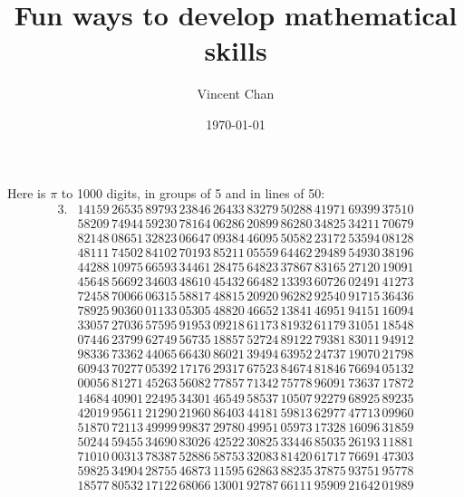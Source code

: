 \documentclass{article}
\title{Fun ways to develop mathematical skills}
\author{Vincent Chan}
\date{\today}
\begin{document}
{\Large
Here is $\pi$ to 1000 digits, in groups of 5 and in lines of 50:}
\LARGE
\begin{align*}
3.&14159 \, 26535 \, 89793 \, 23846 \, 26433 \, 83279 \, 50288 \, 41971 \, 69399 \, 37510 \\ 
&58209 \, 74944 \, 59230 \, 78164 \, 06286 \, 20899 \, 86280 \, 34825 \, 34211 \, 70679 \\
&82148 \, 08651 \, 32823 \, 06647 \, 09384 \, 46095 \, 50582 \, 23172 \, 53594 \, 08128 \\
&48111 \, 74502 \, 84102 \, 70193 \, 85211 \, 05559 \, 64462 \, 29489 \, 54930 \, 38196 \\ 
&44288 \, 10975 \, 66593 \, 34461 \, 28475 \, 64823 \, 37867 \, 83165 \, 27120 \, 19091 \\
&45648 \, 56692 \, 34603 \, 48610 \, 45432 \, 66482 \, 13393 \, 60726 \, 02491 \, 41273 \\
&72458 \, 70066 \, 06315 \, 58817 \, 48815 \, 20920 \, 96282 \, 92540 \, 91715 \, 36436 \\
&78925 \, 90360 \, 01133 \, 05305 \, 48820 \, 46652 \, 13841 \, 46951 \, 94151 \, 16094 \\
&33057 \, 27036 \, 57595 \, 91953 \, 09218 \, 61173 \, 81932 \, 61179 \, 31051 \, 18548 \\
&07446 \, 23799 \, 62749 \, 56735 \, 18857 \, 52724 \, 89122 \, 79381 \, 83011 \, 94912 \\
&98336 \, 73362 \, 44065 \, 66430 \, 86021 \, 39494 \, 63952 \, 24737 \, 19070 \, 21798 \\
&60943 \, 70277 \, 05392 \, 17176 \, 29317 \, 67523 \, 84674 \, 81846 \, 76694 \, 05132 \\
&00056 \, 81271 \, 45263 \, 56082 \, 77857 \, 71342 \, 75778 \, 96091 \, 73637 \, 17872 \\
&14684 \, 40901 \, 22495 \, 34301 \, 46549 \, 58537 \, 10507 \, 92279 \, 68925 \, 89235 \\
&42019 \, 95611 \, 21290 \, 21960 \, 86403 \, 44181 \, 59813 \, 62977 \, 47713 \, 09960 \\
&51870 \, 72113 \, 49999 \, 99837 \, 29780 \, 49951 \, 05973 \, 17328 \, 16096 \, 31859 \\
&50244 \, 59455 \, 34690 \, 83026 \, 42522 \, 30825 \, 33446 \, 85035 \, 26193 \, 11881 \\
&71010 \, 00313 \, 78387 \, 52886 \, 58753 \, 32083 \, 81420 \, 61717 \, 76691 \, 47303 \\
&59825 \, 34904 \, 28755 \, 46873 \, 11595 \, 62863 \, 88235 \, 37875 \, 93751 \, 95778 \\
&18577 \, 80532 \, 17122 \, 68066 \, 13001 \, 92787 \, 66111 \, 95909 \, 21642 \, 01989
\end{align*}
\end{document}
